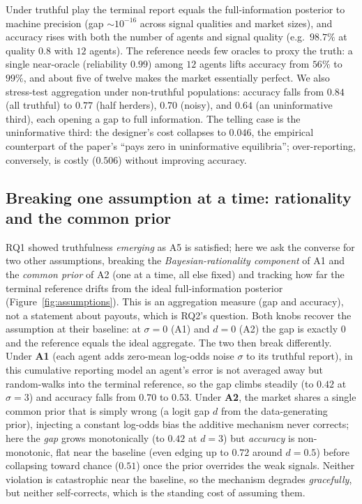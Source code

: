 Under truthful play the terminal report equals the full-information posterior to machine
precision (gap $\sim\!10^{-16}$ across signal qualities and market sizes), and accuracy
rises with both the number of agents and signal quality (e.g.\ $98.7\%$ at quality $0.8$
with $12$ agents). The reference needs few oracles to proxy the truth: a single near-oracle
(reliability $0.99$) among $12$ agents lifts accuracy from $56\%$ to $99\%$, and about five
of twelve makes the market essentially perfect. We also stress-test aggregation under
non-truthful populations: accuracy falls from $0.84$ (all truthful) to $0.77$ (half
herders), $0.70$ (noisy), and $0.64$ (an uninformative third), each opening a gap to full
information. The telling case is the uninformative third: the designer's cost collapses
to $0.046$, the empirical counterpart of the paper's ``pays zero in uninformative
equilibria''; over-reporting, conversely, is costly ($0.506$) without improving accuracy.

\subsection{Breaking one assumption at a time: rationality and the common prior}

RQ1 showed truthfulness \emph{emerging} as A5 is satisfied; here we ask the converse for two
other assumptions, breaking the \emph{Bayesian-rationality component} of A1 and the
\emph{common prior} of A2 (one at a time, all else fixed) and tracking how far the terminal
reference drifts from the ideal full-information posterior (Figure~\ref{fig:assumptions}).
This is an aggregation measure (gap and accuracy), not a statement about payouts, which is
RQ2's question. Both knobs recover the assumption at their baseline: at $\sigma=0$ (A1) and
$d=0$ (A2) the gap is exactly $0$ and the reference equals the ideal aggregate. The two then
break differently. Under \textbf{A1} (each agent adds zero-mean log-odds noise $\sigma$ to its
truthful report), in this cumulative reporting model an agent's error is not averaged away but
random-walks into the terminal reference, so the gap climbs steadily (to $0.42$ at $\sigma=3$)
and accuracy falls from $0.70$ to $0.53$. Under \textbf{A2}, the market shares a single common
prior that is simply wrong (a logit gap $d$ from the data-generating prior), injecting a
constant log-odds bias the additive mechanism never corrects; here the \emph{gap} grows
monotonically (to $0.42$ at $d=3$) but \emph{accuracy} is non-monotonic, flat near the baseline
(even edging up to $0.72$ around $d=0.5$) before collapsing toward chance ($0.51$) once the
prior overrides the weak signals. Neither violation is catastrophic near the baseline, so the
mechanism degrades \emph{gracefully}, but neither self-corrects, which is the standing cost of
assuming them.


